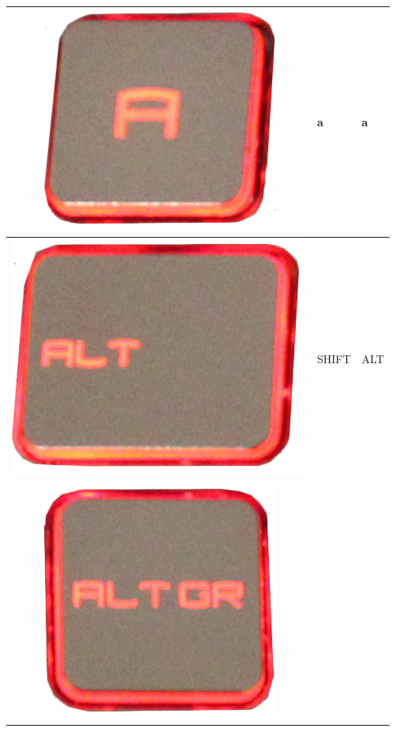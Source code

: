\begin{longtable}{|cll|}
\begin{minipage}[c]{.4\textwidth}
\includegraphics[scale=0.08]{Images/KeyMapping/a}
\vspace{0.2cm}
\end{minipage} & a & a\\
\hline
\begin{minipage}[c]{.4\textwidth}
\vspace{0.2cm}
\includegraphics[scale=0.08]{Images/KeyMapping/ALT}
\vspace{0.2cm}
\end{minipage} & SHIFT & ALT\\
\hline
\begin{minipage}[c]{.4\textwidth}
\vspace{0.2cm}
\includegraphics[scale=0.08]{Images/KeyMapping/ALT_GR}

\end{minipage}
\end{longtable}
